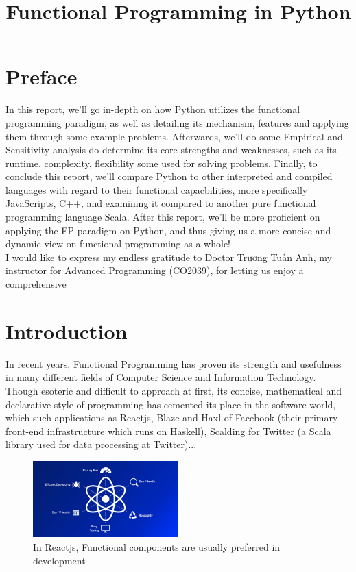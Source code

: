 \documentclass[twoside,final]{hcmut-report}
\title{Functional Programming in Python}
\begin{document}
\coverpage%


\tableofcontents
\listoffigures
\listoftables
\pagebreak
\section{Preface}
\hspace*{1mm} {In this report, we'll go in-depth on how Python utilizes the functional programming paradigm, as well as detailing its mechanism, features and applying them through some example problems. Afterwards, we'll do some Empirical and Sensitivity analysis do determine its core strengths and weaknesses, such as its runtime, complexity, flexibility some used for solving problems. Finally, to conclude this report, we'll compare Python to other interpreted and compiled languages with regard to their functional capacbilities, more specifically JavaScripts, C++, and examining it compared to another pure functional programming language Scala. After this report, we'll be more proficient on applying the FP paradigm on Python, and thus giving us a more concise and dynamic view on functional programming as a whole!}\\
\hspace*{6.5mm} I would like to express my endless gratitude to Doctor Trương Tuấn Anh, my instructor for Advanced Programming (CO2039), for letting us enjoy a comprehensive 


\section{Introduction}
\hspace*{4mm} In recent years, Functional Programming has proven its strength and usefulness in many different fields of Computer Science and Information Technology. Though esoteric and difficult to approach at first, its concise, mathematical and declarative style of programming has cemented its place in the software world, which such applications as Reactjs, Blaze and Haxl of Facebook (their primary front-end infrastructure which runs on Haskell),  Scalding for Twitter (a Scala library used for data processing at Twitter)...  
\begin{figure}[ht]
\centering
\includegraphics[width=0.5\textwidth]{graphics/reactjs.jpeg}
\caption{In Reactjs, Functional components are usually preferred in development}

\end{figure}
\end{document}
